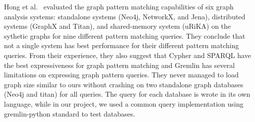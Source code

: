 Hong et al.~\cite{hong2016evaluation} evaluated the graph pattern matching capabilities of six graph analysis systems: standalone systems (Neo4j, NetworkX, and Jena), distributed systems (GraphX and Titan), and shared-memory system (uRiKA) on the sythetic graphs for nine different pattern matching queries. They conclude that not a single system has best performance for their different pattern matching queries. From their experience, they also suggest that Cypher and SPARQL have the best expressiveness for graph pattern matching and Gremlin has several limitations on expressing graph pattern queries. They never managed to load graph size similar to ours without crashing on two standalone graph databases (Neo4j and titan) for all queries. The query for each database is wrote in its own language, while in our project, we used a common query implementation using gremlin-python standard to test databases. 

